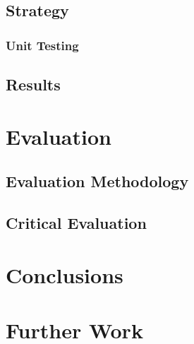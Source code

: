 \documentclass[12pt, a4paper]{article}
\begin{document}
\subsection{Strategy}
\subsubsection{Unit Testing}
\subsection{Results}

\section{Evaluation}
\subsection{Evaluation Methodology}
\subsection{Critical Evaluation}
\section{Conclusions}

\section{Further Work}

 
        \newpage
 
\end{document}
